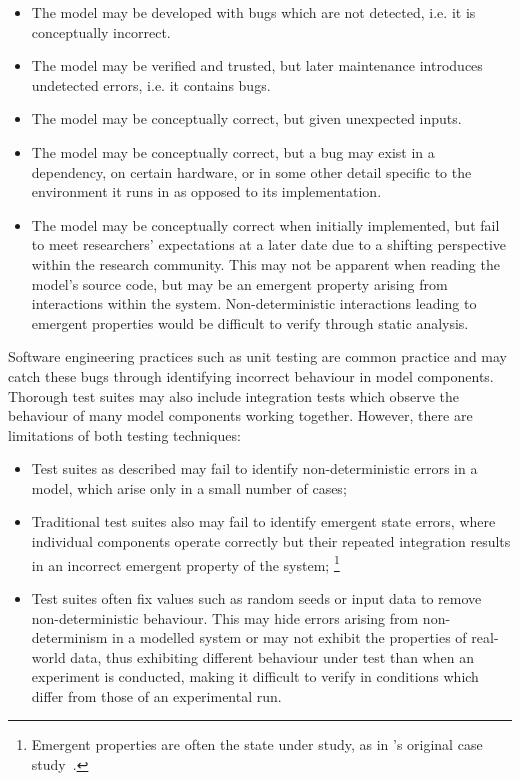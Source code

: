 \begin{itemize}
    \item The model may be developed with bugs which are not detected, i.e. it is
    conceptually incorrect.
    \item The model may be verified and trusted, but later maintenance introduces
    undetected errors, i.e. it contains bugs.
    \item The model may be conceptually correct, but given unexpected inputs.
    \item The model may be conceptually correct, but a bug may exist in a
    dependency, on certain hardware, or in some other detail specific to the
    environment it runs in as opposed to its implementation.
    \item The model may be conceptually correct when initially implemented, but
    fail to meet researchers' expectations at a later date due to a shifting
    perspective within the research community. This may not be apparent when
    reading the model's source code, but may be an emergent property arising
    from interactions within the system. Non-deterministic interactions leading
    to emergent properties would be difficult to verify through static analysis.
\end{itemize}

Software engineering practices such as unit testing are common practice and may
catch these bugs through identifying incorrect behaviour in model components.
Thorough test suites may also include integration tests which observe the
behaviour of many model components working together. However, there are
limitations of both testing techniques:

\begin{itemize}
    \item Test suites as described may fail to identify non-deterministic errors
    in a model, which arise only in a small number of cases;
    \item Traditional test suites also may fail to identify emergent state
    errors, where individual components operate correctly but their repeated
    integration results in an incorrect emergent property of the system;
    \footnote{Emergent properties are often the state under study, as in \pdsf's original
    case study~\cite{wallis2018caise}.}
    \item Test suites often fix values such as random seeds or input data to
    remove non-deterministic behaviour. This may hide errors arising from
    non-determinism in a modelled system or may not exhibit the properties of
    real-world data, thus exhibiting different behaviour under test than when an
    experiment is conducted, making it difficult to verify in conditions which
    differ from those of an experimental run.
\end{itemize}

